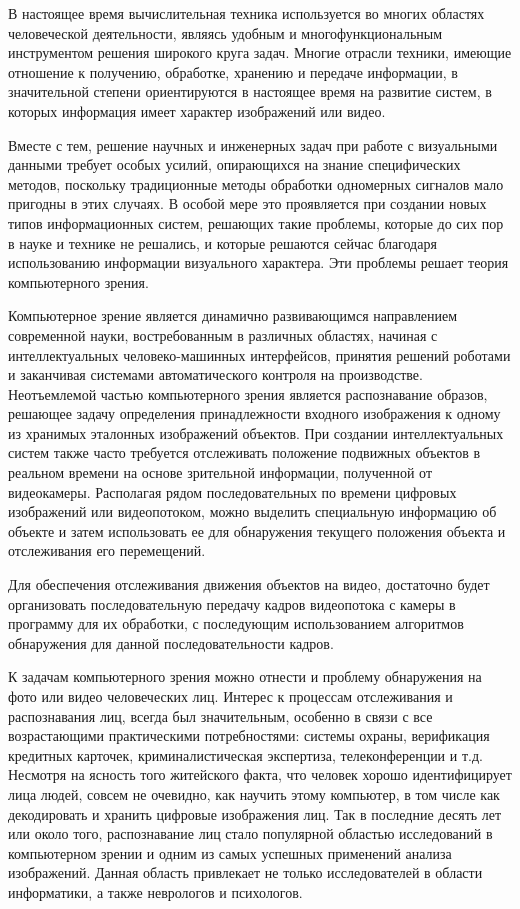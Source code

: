 \label{sec:intro}

В настоящее время вычислительная техника используется во многих областях человеческой деятельности, являясь удобным и многофункциональным инструментом решения широкого круга задач. Многие отрасли техники, имеющие отношение к получению, обработке, хранению и передаче информации, в значительной степени ориентируются в настоящее время на развитие систем, в которых информация имеет характер изображений или видео. 

Вместе с тем, решение научных и инженерных задач при работе с визуальными данными требует особых усилий, опирающихся на знание специфических методов, поскольку традиционные методы обработки одномерных сигналов мало пригодны в этих случаях. В особой мере это проявляется при создании новых типов информационных систем, решающих такие проблемы, которые до сих пор в науке и технике не решались, и которые решаются сейчас благодаря использованию информации визуального характера. Эти проблемы решает теория компьютерного зрения.

Компьютерное зрение является динамично развивающимся направлением современной науки, востребованным в различных областях, начиная с интеллектуальных человеко-машинных интерфейсов, принятия решений роботами и заканчивая системами автоматического контроля на производстве. Неотъемлемой частью компьютерного зрения является распознавание образов, решающее задачу определения принадлежности входного изображения к одному из хранимых эталонных изображений объектов. При создании интеллектуальных систем также часто требуется отслеживать положение подвижных объектов в реальном времени на основе зрительной информации, полученной от видеокамеры. Располагая рядом последовательных по времени цифровых изображений или видеопотоком, можно выделить специальную информацию об объекте и затем использовать ее для обнаружения текущего положения объекта и отслеживания его перемещений. 

Для обеспечения отслеживания движения объектов  на видео, достаточно будет организовать последовательную передачу кадров видеопотока с камеры в программу для их обработки, с последующим использованием алгоритмов обнаружения для данной последовательности кадров.

К задачам компьютерного зрения можно отнести и проблему обнаружения на фото или видео человеческих лиц. Интерес к процессам отслеживания и распознавания лиц, всегда был значительным, особенно в связи с все возрастающими практическими потребностями: системы охраны, верификация кредитных карточек, криминалистическая экспертиза, телеконференции и т.д. Несмотря на ясность того житейского факта, что человек хорошо идентифицирует лица людей, совсем не очевидно, как научить этому компьютер, в том числе как декодировать и хранить цифровые изображения лиц. Так в последние десять лет или около того, распознавание лиц стало популярной областью исследований в компьютерном зрении и одним из самых успешных применений анализа изображений. Данная область привлекает не только исследователей в области информатики, а также неврологов и психологов.

